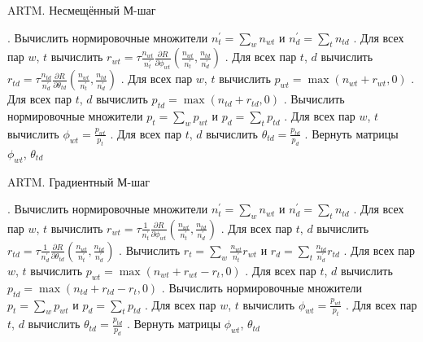 \documentclass[12pt]{article}
\newenvironment{rusalgorithm}[1][htb]
  {\renewcommand{\algorithmcfname}{Алгоритм}
   \begin{algorithm}[#1]
  }{\end{algorithm}}
\begin{document}
\begin{rusalgorithm}[H]
\caption{ARTM. Несмещённый М-шаг}\label{malgo2}
\begin{algorithmic}[]
. Вычислить нормировочные множители $n^{\prime}_t = \sum_w n_{wt}$ и $n^{\prime}_d = \sum_t n_{td}$
. Для всех пар $w$, $t$ вычислить $r_{wt}= \tau \frac{n_{wt}}{n^{\prime}_t}\frac{\partial{R}}{\partial{\phi_{wt}}}(\frac{n_{wt}}{n^{\prime}_t}, \frac{n_{td}}{n^{\prime}_d})$
. Для всех пар $t$, $d$ вычислить $r_{td}= \tau \frac{n_{td}}{n^{\prime}_d}\frac{\partial{R}}{\partial{\theta_{td}}}(\frac{n_{wt}}{n^{\prime}_t}, \frac{n_{td}}{n^{\prime}_d})$
. Для всех пар $w$, $t$ вычислить $p_{wt} = \max(n_{wt} + r_{wt}, 0)$
. Для всех пар $t$, $d$ вычислить $p_{td} = \max(n_{td} + r_{td}, 0)$
. Вычислить нормировочные множители $p_t = \sum_w p_{wt}$ и $p_d = \sum_t p_{td}$
. Для всех пар $w$, $t$ вычислить $\phi_{wt} = \frac{p_{wt}}{p_t}$
. Для всех пар $t$, $d$ вычислить $\theta_{td} = \frac{p_{td}}{p_d}$
. Вернуть матрицы $\phi_{wt}$, $\theta_{td}$
\EndProcedure
\end{algorithmic}
\end{rusalgorithm}
\newpage


\begin{rusalgorithm}[H]
\caption{ARTM. Градиентный М-шаг}\label{malgo3}
\begin{algorithmic}[]
. Вычислить нормировочные множители $n^{\prime}_t = \sum_w n_{wt}$ и $n^{\prime}_d = \sum_t n_{td}$
. Для всех пар $w$, $t$ вычислить $r_{wt}= \tau \frac{1}{n^{\prime}_t} \frac{\partial{R}}{\partial{\phi_{wt}}}(\frac{n_{wt}}{n^{\prime}_t}, \frac{n_{td}}{n^{\prime}_d})$
. Для всех пар $t$, $d$ вычислить $r_{td}= \tau \frac{1}{n^{\prime}_d} \frac{\partial{R}}{\partial{\theta_{td}}}(\frac{n_{wt}}{n^{\prime}_t}, \frac{n_{td}}{n^{\prime}_d})$
. Вычислить $r_t = \sum_w \frac{n_{wt}}{n^{\prime}_t} r_{wt}$ и $r_d = \sum_t \frac{n_{td}}{n^{\prime}_d} r_{td}$
. Для всех пар $w$, $t$ вычислить $p_{wt} = \max(n_{wt} + r_{wt} - r_t, 0)$
. Для всех пар $t$, $d$ вычислить $p_{td} = \max(n_{td} + r_{td} - r_t, 0)$
. Вычислить нормировочные множители $p_t = \sum_w p_{wt}$ и $p_d = \sum_t p_{td}$
. Для всех пар $w$, $t$ вычислить $\phi_{wt} = \frac{p_{wt}}{p_t}$
. Для всех пар $t$, $d$ вычислить $\theta_{td} = \frac{p_{td}}{p_d}$
. Вернуть матрицы $\phi_{wt}$, $\theta_{td}$
\EndProcedure
\end{algorithmic}
\end{rusalgorithm}
\end{document}
